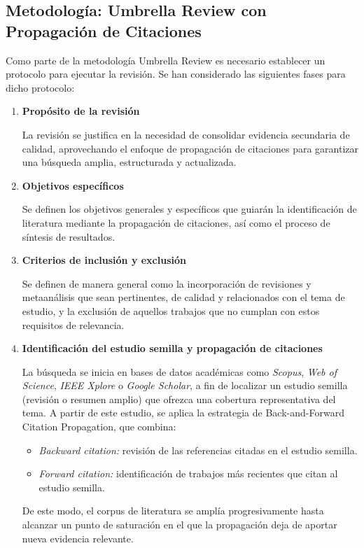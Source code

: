 \subsection*{Metodología: Umbrella Review con Propagación de Citaciones}
Como parte de la metodología Umbrella Review es necesario establecer un protocolo para ejecutar la revisión.
Se han considerado las siguientes fases para dicho protocolo:
\begin{enumerate}
    \item \textbf{Propósito de la revisión}  
    
    La revisión se justifica en la necesidad de consolidar evidencia secundaria de calidad, aprovechando el enfoque de propagación de citaciones 
    para garantizar una búsqueda amplia, estructurada y actualizada.

    \item \textbf{Objetivos específicos}  

    Se definen los objetivos generales y específicos que guiarán la identificación de literatura mediante la propagación de citaciones, 
    así como el proceso de síntesis de resultados.

    \item \textbf{Criterios de inclusión y exclusión}  

    Se definen de manera general como la incorporación de revisiones y metaanálisis que sean pertinentes, de calidad y relacionados con el tema de estudio, 
    y la exclusión de aquellos trabajos que no cumplan con estos requisitos de relevancia.
    
    \item \textbf{Identificación del estudio semilla y propagación de citaciones}  
    
    La búsqueda se inicia en bases de datos académicas como \textit{Scopus}, \textit{Web of Science}, \textit{IEEE Xplore} o \textit{Google Scholar}, a fin de localizar 
    un estudio semilla (revisión o resumen amplio) que ofrezca una cobertura representativa del tema.  
    A partir de este estudio, se aplica la estrategia de Back-and-Forward Citation Propagation, que combina:  
    \begin{itemize}
        \item \textit{Backward citation:} revisión de las referencias citadas en el estudio semilla.  
        \item \textit{Forward citation:} identificación de trabajos más recientes que citan al estudio semilla.  
    \end{itemize}
    De este modo, el corpus de literatura se amplía progresivamente hasta alcanzar un punto de saturación en el que la propagación deja de aportar nueva evidencia relevante.


\end{enumerate}
